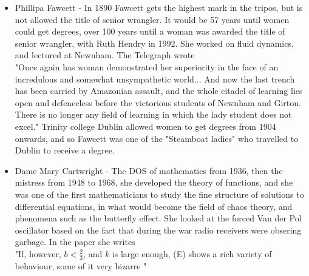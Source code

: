 \documentclass{article}
\begin{document}
\begin{itemize}
    
    \item Phillipa Fawcett - In 1890 Fawcett gets the highest mark in the tripos, but is not allowed the title of senior wrangler. It would be 57 years until women could get degrees, over 100 years until a woman was awarded the title of senior wrangler, with Ruth Hendry in 1992. She worked on fluid dynamics, and lectured at Newnham. The Telegraph wrote \\
    \newline
    "Once again has woman demonstrated her superiority in the face of an incredulous and somewhat unsympathetic world... And now the last trench has been carried by Amazonian assault, and the whole citadel of learning lies open and defenceless before the victorious students of Newnham and Girton. There is no longer any field of learning in which the lady student does not excel."
    \newline
    Trinity college Dublin allowed women to get degrees from 1904 onwards, and so Fawcett was one of the "Steamboat ladies" who travelled to Dublin to receive a degree. 
    
    \item Dame Mary Cartwright - The DOS of mathematics from 1936, then the mistress from 1948 to 1968, she developed the theory of functions, and she was one of the first mathematicians to study the fine structure of solutions to differential equations, in what would become the field of chaos theory, and phenomena such as the butterfly effect. She looked at the forced Van der Pol oscillator
    based on the fact that during the war radio receivers were obsering garbage. In the paper she writes \\
    \newline
    "If,  however,  $b <  \frac{2}{3}$, and $k$ is large  enough,  (E) shows a rich  variety of behaviour,  some  of it very  bizarre "
    \newline
    

\end{itemize}
\end{document}
